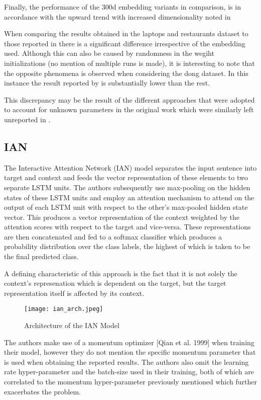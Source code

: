 \documentclass[../../fyp.tex]{subfiles}
\begin{document}
Finally, the performance of the 300d embedding variants in comparison, is in accordance with the upward trend with increased dimensionality noted in \cite{moore2018}

When comparing the results obtained in the laptops and restaurants dataset to those reported in \cite{chen2017} there is a significant difference irrespective of the embedding used. Although this can also be caused by randomness in the wegiht initializations (no mention of multiple runs is made), it is interesting to note that the opposite phenomena is observed when considering the dong dataset. In this instance the result reported by \cite{chen2017} is substantially lower than the rest.

This discrepancy may be the result of the different approaches that were adopted to account for unknown parameters in the original work \cite{tang2016b} which were similarly left unreported in \cite{chen2017}.

\subsection{IAN}

The Interactive Attention Network (IAN) model \cite{dehongma2017} separates the input sentence into target and context and feeds the vector representation of these elements to two separate LSTM units. The authors subsequently use max-pooling on the hidden states of these LSTM units and employ an attention mechanism to attend on the output of each LSTM unit with respect to the other's max-pooled hidden state vector. This produces a vector representation of the context weighted by the attention scores with respect to the target and vice-versa. These representations are then concatenated and fed to a softmax classifier which produces a probability distribution over the class labels, the highest of which is taken to be the final predicted class. 

A defining characteristic of this approach is the fact that it is not solely the context's represenation which is dependent on the target, but the target representation itself is affected by its context. 

\begin{figure}[!ht]
	\centering
	\texttt{[image: ian\_arch.jpeg]}
	\caption{Architecture of the IAN Model \cite{dehongma2017}}
	\label{fig:ffnn}
\end{figure}

The authors make use of a momentum optimizer [Qian et al. 1999] when training their model, however they do not mention the specific momentum parameter that is used when obtaining the reported results. The authors also omit the learning rate hyper-parameter and the batch-size used in their training, both of which are correlated to the momentum hyper-parameter previously mentioned which further exacerbates the problem. 
\end{document}
